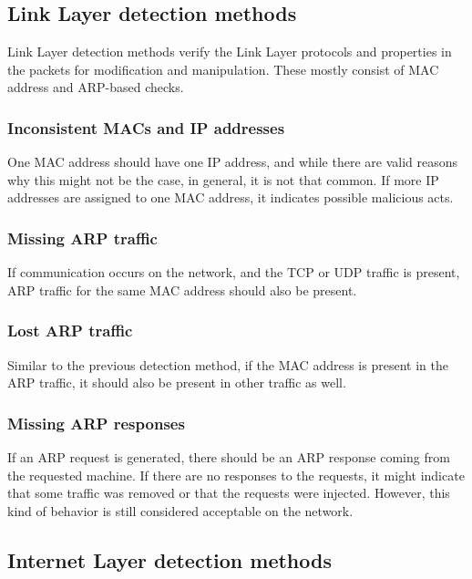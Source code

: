 \documentclass[
  printed,     %
  color,       %
  oneside,     %
  nosansbold,  %
  nocolorbold, %
  nolof,         %
  nolot,         %
]{fithesis4}
\begin{document}
\subsection{Link Layer detection methods}

Link Layer detection methods verify the Link Layer protocols and properties in the packets for modification and manipulation. These mostly consist of MAC address and ARP-based checks.

\subsubsection{Inconsistent MACs and IP addresses}

One MAC address should have one IP address, and while there are valid reasons why this might not be the case, in general, it is not that common. If more IP addresses are assigned to one MAC address, it indicates possible malicious acts.

\subsubsection{Missing ARP traffic}

If communication occurs on the network, and the TCP or UDP traffic is present, ARP traffic for the same MAC address should also be present.

\subsubsection{Lost ARP traffic}

Similar to the previous detection method, if the MAC address is present in the ARP traffic, it should also be present in other traffic as well.

\subsubsection{Missing ARP responses}

If an ARP request is generated, there should be an ARP response coming from the requested machine. If there are no responses to the requests, it might indicate that some traffic was removed or that the requests were injected. However, this kind of behavior is still considered acceptable on the network.

\subsection{Internet Layer detection methods}
\end{document}
